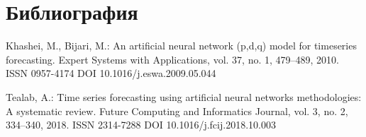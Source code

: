 \chapter*{Библиография}

\begin{thebibliography}{99.}

 Khashei, M., Bijari, M.: An artificial neural network (p,d,q) model for timeseries forecasting. Expert Systems with Applications, vol. 37, no. 1, 479--489, 2010. ISSN 0957-4174 DOI 10.1016/j.eswa.2009.05.044

 Tealab, A.: Time series forecasting using artificial neural networks methodologies: A systematic review. Future Computing and Informatics Journal, vol. 3, no. 2, 334--340, 2018. ISSN 2314-7288 DOI 10.1016/j.fcij.2018.10.003

\end{thebibliography}
